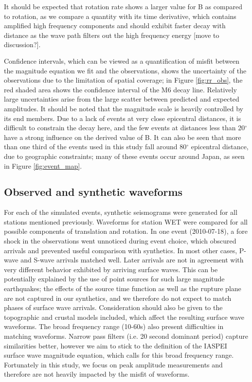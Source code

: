 \documentclass{gji}
\begin{document}
It should be expected that rotation rate shows a larger value for B as compared to rotation, as we compare a quantity with its time derivative, which contains amplified high frequency components and should exhibit faster decay with distance as the wave path filters out the high frequency energy [move to discussion?]. 

Confidence intervals, which can be viewed as a quantification of misfit between the magnitude equation we fit and the observations, shows the uncertainty of the observations due to the limitation of spatial coverage; in Figure \ref{fig:rr_obs}, the red shaded area shows the confidence interval of the M6 decay line. Relatively large uncertainties arise from the large scatter between predicted and expected amplitudes.%
It should be noted that the magnitude scale is heavily controlled by its end members. Due to a lack of events at very close epicentral distances, it is difficult to constrain the decay here, and the few events at distances less than 20$^\circ$ have a strong influence on the derived value of B. It can also be seen that more than one third of the events used in this study fall around 80$^\circ$ epicentral distance, due to geographic constraints; many of these events occur around Japan, as seen in Figure \ref{fig:event_map}.  

\subsection{Observed and synthetic waveforms}
For each of the simulated events, synthetic seismograms were generated for all stations mentioned previously. Waveforms for station WET were compared for all possible components of translation and rotation. In one event (2010-07-18), a fore shock in the observations went unnoticed during event choice, which obscured arrivals and prevented useful comparison with synthetics. In most other cases, P-wave and S-wave arrivals matched well. Later arrivals are not in agreement with very different behavior exhibited by arriving surface waves. This can be potentially explained by the use of point sources for such large magnitude earthquakes; the effects of the source time function as well as the rupture plane are not captured in our synthetics, and we therefore do not expect to match phases of surface wave arrivals. Consideration should also be given to the topographic and crustal models included, which affect the resulting surface wave waveforms. The broad frequency range (10-60s) also present difficulties in matching waveforms. Narrow pass filters (i.e. 20 second dominant period) capture similarities better, however we aim to stick to the definition of the IASPEI surface wave magnitude equation, which calls for this broad frequency range. Fortunately in this study, we focus on peak amplitude measurements and therefore are not heavily impacted by the misfit of waveforms.
\end{document}
